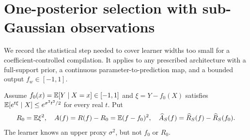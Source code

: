 \section{One-posterior selection with sub-Gaussian observations}
\label{sec:noisy-certificate-selection}
We record the statistical step needed to cover learner widths too small for a coefficient-controlled compilation. It applies to any prescribed architecture with a full-support prior, a continuous parameter-to-prediction map, and a bounded output $f_w\in[-1,1]$.

Assume $f_0(x)=\mathbb E[Y\mid X=x]\in[-1,1]$ and $\xi=Y-f_0(X)$ satisfies
$\mathbb E[e^{t\xi}\mid X]\le e^{\sigma^2t^2/2}$ for every real $t$. Put
\[
 R_0=\mathbb E\xi^2,\quad A(f)=R(f)-R_0=\mathbb E(f-f_0)^2,
 \quad \widehat A_S(f)=\widehat R_S(f)-\widehat R_S(f_0).
\]
The learner knows an upper proxy $\sigma^2$, but not $f_0$ or $R_0$.

